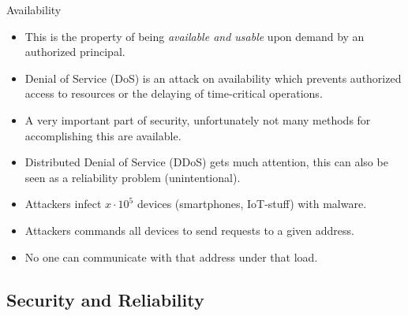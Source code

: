 \documentclass{beamer}
\begin{document}
\begin{frame}{Availability}
  \begin{itemize}
    \item This is the property of being \emph{available and usable} upon demand 
      by an authorized principal.

    \item Denial of Service (DoS) is an attack on availability which prevents 
      authorized access to resources or the delaying of time-critical 
      operations.

    \item A very important part of security, unfortunately not many methods for 
      accomplishing this are available.

    \item Distributed Denial of Service (DDoS) gets much attention, this can 
      also be seen as a reliability problem (unintentional).
  \end{itemize}
\end{frame}

\begin{frame}
  \begin{example}[DDoS]
    \begin{itemize}
      \item Attackers infect \(x\cdot 10^5\) devices (smartphones, IoT-stuff) 
        with malware.
      \item Attackers commands all devices to send requests to a given address.
      \item No one can communicate with that address under that load.
    \end{itemize}
  \end{example}
\end{frame}

\subsection{Security and Reliability}
\end{document}
